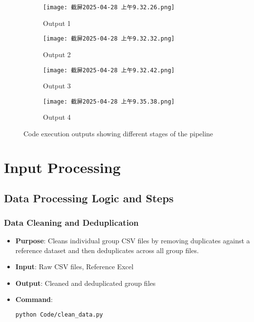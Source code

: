 \documentclass[12pt]{article}
\begin{document}
\begin{figure}[!p]
  \centering
  
  \begin{subfigure}{0.5\textwidth}
    \texttt{[image: 截屏2025-04-28 上午9.32.26.png]}
    \caption{Output 1}
    \label{fig:out1}
  \end{subfigure}
  
  \vspace{2pt} %
  
  \begin{subfigure}{0.5\textwidth}
    \texttt{[image: 截屏2025-04-28 上午9.32.32.png]}
    \caption{Output 2}
    \label{fig:out2}
  \end{subfigure}
  
  \vspace{2pt}
  
  \begin{subfigure}{0.5\textwidth}
    \texttt{[image: 截屏2025-04-28 上午9.32.42.png]}
    \caption{Output 3}
    \label{fig:out3}
  \end{subfigure}
  
  \vspace{2pt}
  
  \begin{subfigure}{0.5\textwidth}
    \texttt{[image: 截屏2025-04-28 上午9.35.38.png]}
    \caption{Output 4}
    \label{fig:out4}
  \end{subfigure}
  
  \caption{Code execution outputs showing different stages of the pipeline}
  \label{fig:all_outputs}
\end{figure}



\section{Input Processing}

\subsection{Data Processing Logic and Steps}

\subsubsection{Data Cleaning and Deduplication}
\begin{itemize}
    \item \textbf{Purpose}: Cleans individual group CSV files by removing duplicates against a reference dataset and then deduplicates across all group files.
    \item \textbf{Input}: Raw CSV files, Reference Excel
    \item \textbf{Output}: Cleaned and deduplicated group files
    \item \textbf{Command}:
    \begin{lstlisting}[language=bash]
    python Code/clean_data.py
    \end{lstlisting}
\end{itemize}
\end{document}
